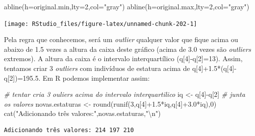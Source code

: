 \documentclass[
]{article}
\newenvironment{Shaded}{\begin{snugshade}}{\end{snugshade}}
\newcommand{\AttributeTok}[1]{\textcolor[rgb]{0.77,0.63,0.00}{#1}}
\newcommand{\CommentTok}[1]{\textcolor[rgb]{0.56,0.35,0.01}{\textit{#1}}}
\newcommand{\DecValTok}[1]{\textcolor[rgb]{0.00,0.00,0.81}{#1}}
\newcommand{\FloatTok}[1]{\textcolor[rgb]{0.00,0.00,0.81}{#1}}
\newcommand{\FunctionTok}[1]{\textcolor[rgb]{0.00,0.00,0.00}{#1}}
\newcommand{\NormalTok}[1]{#1}
\newcommand{\OtherTok}[1]{\textcolor[rgb]{0.56,0.35,0.01}{#1}}
\newcommand{\SpecialCharTok}[1]{\textcolor[rgb]{0.00,0.00,0.00}{#1}}
\newcommand{\StringTok}[1]{\textcolor[rgb]{0.31,0.60,0.02}{#1}}
\begin{document}
\begin{Shaded}
\begin{Highlighting}[]
\FunctionTok{abline}\NormalTok{(}\AttributeTok{h=}\NormalTok{original.min,}\AttributeTok{lty=}\DecValTok{2}\NormalTok{,}\AttributeTok{col=}\StringTok{"gray"}\NormalTok{)}
\FunctionTok{abline}\NormalTok{(}\AttributeTok{h=}\NormalTok{original.max,}\AttributeTok{lty=}\DecValTok{2}\NormalTok{,}\AttributeTok{col=}\StringTok{"gray"}\NormalTok{)}
\end{Highlighting}
\end{Shaded}

\begin{center}\texttt{[image: RStudio\_files/figure-latex/unnamed-chunk-202-1]} \end{center}

Pela regra que conhecemos, será um \emph{outlier} qualquer valor que
fique acima ou abaixo de 1.5 vezes a altura da caixa deste gráfico
(acima de 3.0 vezes são \emph{outliers} extremos). A altura da caixa é o
intervalo interquartílico (q{[}4{]}-q{[}2{]}=13). Assim, tentamos criar
3 \emph{outliers} com indivíduos de estatura acima de
q{[}4{]}+1.5*(q{[}4{]}-q{[}2{]})=195.5. Em R podemos implementar assim:

\begin{Shaded}
\begin{Highlighting}[]
\CommentTok{\# tentar cria 3 ouliers acima do intervalo interquartilico}
\NormalTok{iq }\OtherTok{\textless{}{-}}\NormalTok{ q[}\DecValTok{4}\NormalTok{]}\SpecialCharTok{{-}}\NormalTok{q[}\DecValTok{2}\NormalTok{]}
\CommentTok{\# junta os valores }
\NormalTok{novas.estaturas }\OtherTok{\textless{}{-}} \FunctionTok{round}\NormalTok{(}\FunctionTok{runif}\NormalTok{(}\DecValTok{3}\NormalTok{,q[}\DecValTok{4}\NormalTok{]}\SpecialCharTok{+}\FloatTok{1.5}\SpecialCharTok{*}\NormalTok{iq,q[}\DecValTok{4}\NormalTok{]}\SpecialCharTok{+}\FloatTok{3.0}\SpecialCharTok{*}\NormalTok{iq),}\DecValTok{0}\NormalTok{)}
\FunctionTok{cat}\NormalTok{(}\StringTok{"Adicionando três valores:"}\NormalTok{,novas.estaturas,}\StringTok{"}\SpecialCharTok{\textbackslash{}n}\StringTok{"}\NormalTok{)}
\end{Highlighting}
\end{Shaded}

\begin{verbatim}
Adicionando três valores: 214 197 210 
\end{verbatim}
\end{document}
